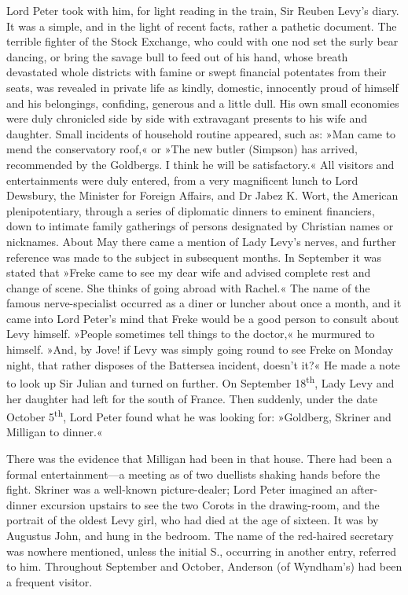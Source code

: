 Lord Peter took with him, for light reading in the train, Sir Reuben Levy's diary. It was a simple, and in the light of recent facts, rather a pathetic document. The terrible fighter of the Stock Exchange, who could with one nod set the surly bear dancing, or bring the savage bull to feed out of his hand, whose breath devastated whole districts with famine or swept financial potentates from their seats, was revealed in private life as kindly, domestic, innocently proud of himself and his belongings, confiding, generous and a little dull. His own small economies were duly chronicled side by side with extravagant presents to his wife and daughter. Small incidents of household routine appeared, such as: »Man came to mend the conservatory roof,« or »The new butler (Simpson) has arrived, recommended by the Goldbergs. I think he will be satisfactory.« All visitors and entertainments were duly entered, from a very magnificent lunch to Lord Dewsbury, the Minister for Foreign Affairs, and Dr Jabez K. Wort, the American plenipotentiary, through a series of diplomatic dinners to eminent financiers, down to intimate family gatherings of persons designated by Christian names or nicknames. About May there came a mention of Lady Levy's nerves, and further reference was made to the subject in subsequent months. In September it was stated that »Freke came to see my dear wife and advised complete rest and change of scene. She thinks of going abroad with Rachel.« The name of the famous nerve-specialist occurred as a diner or luncher about once a month, and it came into Lord Peter's mind that Freke would be a good person to consult about Levy himself. »People sometimes tell things to the doctor,« he murmured to himself. »And, by Jove! if Levy was simply going round to see Freke on Monday night, that rather disposes of the Battersea incident, doesn't it?« He made a note to look up Sir Julian and turned on further. On September 18\textsuperscript{th}, Lady Levy and her daughter had left for the south of France. Then suddenly, under the date October 5\textsuperscript{th}, Lord Peter found what he was looking for: »Goldberg, Skriner and Milligan to dinner.«

There was the evidence that Milligan had been in that house. There had been a formal entertainment—a meeting as of two duellists shaking hands before the fight. Skriner was a well-known picture-dealer; Lord Peter imagined an after-dinner excursion upstairs to see the two Corots in the drawing-room, and the portrait of the oldest Levy girl, who had died at the age of sixteen. It was by Augustus John, and hung in the bedroom. The name of the red-haired secretary was nowhere mentioned, unless the initial S., occurring in another entry, referred to him. Throughout September and October, Anderson (of Wyndham's) had been a frequent visitor.

